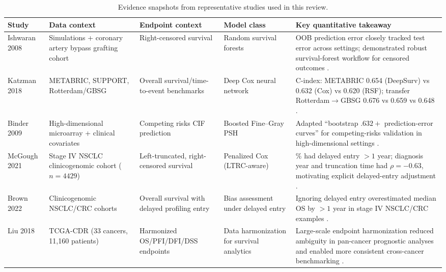 \documentclass[11pt]{article}
\begin{document}
\begin{table}[h!]
\centering
\caption{Evidence snapshots from representative studies used in this review.}
\label{tab:evidence_snapshots}
{\footnotesize
\setlength{\tabcolsep}{5pt}
\renewcommand{\arraystretch}{1.15}
\begin{tabularx}{\textwidth}{
>{\raggedright\arraybackslash}p{1.8cm}
>{\raggedright\arraybackslash}p{2.3cm}
>{\raggedright\arraybackslash}p{2.4cm}
>{\raggedright\arraybackslash}p{2.2cm}
>{\raggedright\arraybackslash}X
}
\toprule
Study & Data context & Endpoint context & Model class & Key quantitative takeaway \\
\midrule
Ishwaran 2008 & Simulations + coronary artery bypass grafting cohort & Right-censored survival & Random survival forests & OOB prediction error closely tracked test error across settings; demonstrated robust survival-forest workflow for censored outcomes \citep{Ishwaran2008}. \\
\addlinespace[0.25em]
Katzman 2018 & METABRIC, SUPPORT, Rotterdam/GBSG & Overall survival/time-to-event benchmarks & Deep Cox neural network & C-index: METABRIC 0.654 (DeepSurv) vs 0.632 (Cox) vs 0.620 (RSF); transfer Rotterdam\(\rightarrow\)GBSG 0.676 vs 0.659 vs 0.648 \citep{Katzman2018}. \\
\addlinespace[0.25em]
Binder 2009 & High-dimensional microarray + clinical covariates & Competing risks CIF prediction & Boosted Fine--Gray PSH & Adapted ``bootstrap $.632+$ prediction-error curves'' for competing-risks validation in high-dimensional settings \citep{Binder2009}. \\
\addlinespace[0.25em]
McGough 2021 & Stage IV NSCLC clinicogenomic cohort (\(n=4429\)) & Left-truncated, right-censored survival & Penalized Cox (LTRC-aware) & 21.5\% had delayed entry \(>1\) year; diagnosis year and truncation time had \(\rho=-0.63\), motivating explicit delayed-entry adjustment \citep{McGough2021}. \\
\addlinespace[0.25em]
Brown 2022 & Clinicogenomic NSCLC/CRC cohorts & Overall survival with delayed profiling entry & Bias assessment under delayed entry & Ignoring delayed entry overestimated median OS by \(>1\) year in stage IV NSCLC/CRC examples \citep{Brown2022}. \\
\addlinespace[0.25em]
Liu 2018 & TCGA-CDR (33 cancers, 11{,}160 patients) & Harmonized OS/PFI/DFI/DSS endpoints & Data harmonization for survival analytics & Large-scale endpoint harmonization reduced ambiguity in pan-cancer prognostic analyses and enabled more consistent cross-cancer benchmarking \citep{Liu2018}. \\
\bottomrule
\end{tabularx}
}
\end{table}





\end{document}

